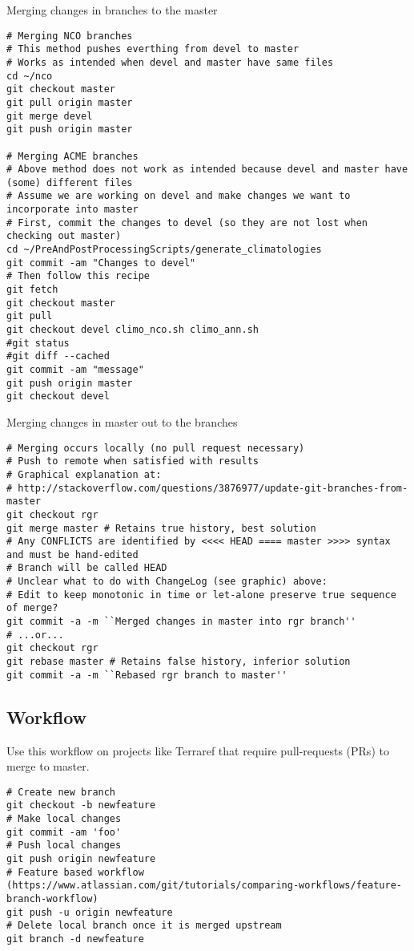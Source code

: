 \documentclass[12pt,twoside]{article}
\begin{document}
Merging changes in branches to the master
\begin{verbatim}
# Merging NCO branches
# This method pushes everthing from devel to master
# Works as intended when devel and master have same files
cd ~/nco
git checkout master
git pull origin master
git merge devel
git push origin master

# Merging ACME branches
# Above method does not work as intended because devel and master have (some) different files
# Assume we are working on devel and make changes we want to incorporate into master
# First, commit the changes to devel (so they are not lost when checking out master)
cd ~/PreAndPostProcessingScripts/generate_climatologies
git commit -am "Changes to devel"
# Then follow this recipe
git fetch
git checkout master
git pull
git checkout devel climo_nco.sh climo_ann.sh
#git status
#git diff --cached
git commit -am "message"
git push origin master
git checkout devel
\end{verbatim}

Merging changes in master out to the branches
\begin{verbatim}
# Merging occurs locally (no pull request necessary)
# Push to remote when satisfied with results
# Graphical explanation at:
# http://stackoverflow.com/questions/3876977/update-git-branches-from-master
git checkout rgr
git merge master # Retains true history, best solution
# Any CONFLICTS are identified by <<<< HEAD ==== master >>>> syntax and must be hand-edited
# Branch will be called HEAD
# Unclear what to do with ChangeLog (see graphic) above:
# Edit to keep monotonic in time or let-alone preserve true sequence of merge?
git commit -a -m ``Merged changes in master into rgr branch''
# ...or...
git checkout rgr
git rebase master # Retains false history, inferior solution
git commit -a -m ``Rebased rgr branch to master''
\end{verbatim}

\subsection{Workflow}\label{sxn:git_wrk}
Use this workflow on projects like Terraref that require pull-requests
(PRs) to merge to master. 
\begin{verbatim}
# Create new branch
git checkout -b newfeature
# Make local changes
git commit -am 'foo'
# Push local changes
git push origin newfeature
# Feature based workflow (https://www.atlassian.com/git/tutorials/comparing-workflows/feature-branch-workflow)
git push -u origin newfeature
# Delete local branch once it is merged upstream
git branch -d newfeature
\end{verbatim}
\end{document}
